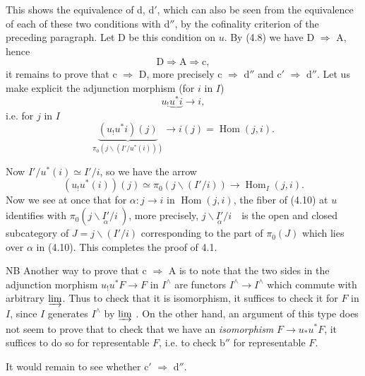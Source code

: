 \documentclass[11pt]{article}
\newcommand{\printedpage}[1]{\marginpar{\footnotesize p.~#1}}
\newcommand{\msp}[1]{\marginpar{\footnotesize [#1]}}
\newcommand{\Hom}{\operatorname{Hom}}
\begin{document}
\printedpage{34}
This shows the equivalence of d, d$'$, which can also be seen from the equivalence of each of these two conditions with d$''$, by the cofinality criterion of the preceding paragraph. Let D be this condition on $u$. By (4.8) we have D $\Longrightarrow$ A, hence %
\[
\mathrm{D} \Longrightarrow \mathrm{A} \Longrightarrow \mathrm{c},
\]
it remains to prove that c $\Longrightarrow$ D, more precisely c $\Longrightarrow$ d$''$ and c$'$ $\Longrightarrow$ d$''$. Let us make explicit the adjunction morphism (for $i$ in $I$)
\[
u_!\underbrace{u^*i} \longrightarrow i,
\]
i.e. for $j$ in $I$
\[
\underbrace{(u_!u^*i)(j)}_{\pi_0(j\backslash(I'/u^*(i)))} \longrightarrow i(j) = \Hom(j,i).
\]

\msp{page 54}Now $I'/u^*(i) \simeq I'/i$, so we have the arrow
\[
(u_!u^*(i))(j) \simeq \pi_0(j\backslash(I'/i)) \longrightarrow \Hom_I(j,i). \tag*{(4.10)}
\]
Now we see at once that for $\alpha : j \longrightarrow i$ in $\Hom(j,i)$, the fiber of (4.10) at $u$ identifies with $\pi_0(j\backslash\underset{\alpha}{I'}/i\ )$, more precisely, $j\backslash\underset{\alpha}{I'}/i$\ \ is the open and closed subcategory of $J = j\backslash(I'/i)$ corresponding to the part of $\pi_0(J)$ which lies over $\alpha$ in (4.10). This completes the proof of 4.1.

NB Another way to prove that c $\Longrightarrow$ A is to note that the two sides in the adjunction morphism $u_!u^*F \longrightarrow F$ in $I^{\wedge}$ are functors $I^{\wedge} \longrightarrow I^{\wedge}$ which commute with arbitrary $\varinjlim$. Thus to check that it is isomorphism, it suffices to check it for $F$ in $I$, since $I$ generates $I^{\wedge}$ by $\varinjlim$ . On the other hand, an argument of this type does not seem to prove that to check that we have an \textit{isomorphism} $F \longrightarrow u_*u^*F$, it suffices to do so for representable $F$, i.e. to check b$''$ for representable $F$.

It would remain to see whether c$'$ $\Longrightarrow$ d$''$.
\end{document}
